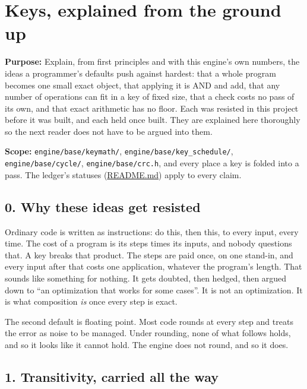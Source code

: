 \chapter{\texorpdfstring{Keys, explained from the ground up}{Keys, explained from the ground up}}
\label{chap:keys-explained}

\textbf{Purpose:} Explain, from first principles and with this engine's own numbers, the ideas a programmer's defaults push against hardest: that a whole program becomes one small exact object, that applying it is AND and add, that any number of operations can fit in a key of fixed size, that a check costs no pass of its own, and that exact arithmetic has no floor. Each was resisted in this project before it was built, and each held once built. They are explained here thoroughly so the next reader does not have to be argued into them.

\textbf{Scope:} \texttt{engine/\allowbreak{}base/\allowbreak{}keymath/\allowbreak{}}, \texttt{engine/\allowbreak{}base/\allowbreak{}key\_\allowbreak{}schedule/\allowbreak{}}, \texttt{engine/\allowbreak{}base/\allowbreak{}cycle/\allowbreak{}}, \texttt{engine/\allowbreak{}base/\allowbreak{}crc.\allowbreak{}h}, and every place a key is folded into a pass. The ledger's statuses (\hyperref[chap:readme]{README.md}) apply to every claim.

\section{\texorpdfstring{0. Why these ideas get resisted}{0. Why these ideas get resisted}}

Ordinary code is written as instructions: do this, then this, to every input, every time. The cost of a program is its steps times its inputs, and nobody questions that. A key breaks that product. The steps are paid once, on one stand-in, and every input after that costs one application, whatever the program's length. That sounds like something for nothing. It gets doubted, then hedged, then argued down to “an optimization that works for some cases”. It is not an optimization. It is what composition \emph{is} once every step is exact.

The second default is floating point. Most code rounds at every step and treats the error as noise to be managed. Under rounding, none of what follows holds, and so it looks like it cannot hold. The engine does not round, and so it does.

\section{\texorpdfstring{1. Transitivity, carried all the way}{1. Transitivity, carried all the way}}

